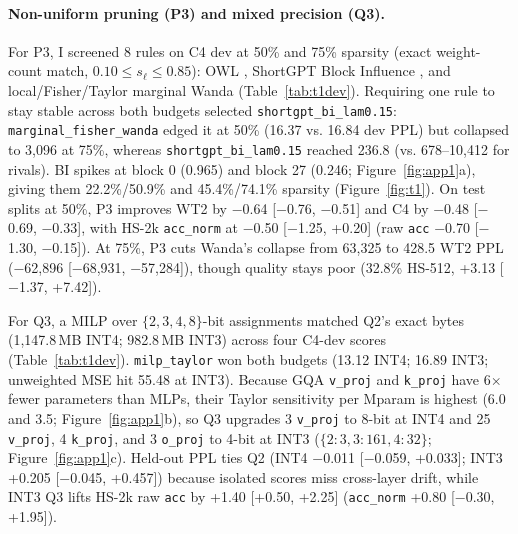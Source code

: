\documentclass{article}
\begin{document}
\paragraph{Non-uniform pruning (P3) and mixed precision (Q3).}
For P3, I screened 8 rules on C4 dev at 50\% and 75\% sparsity (exact weight-count match, $0.10 \le s_\ell \le 0.85$): OWL \citep{yin2024owl}, ShortGPT Block Influence \citep{men2024shortgpt}, and local/Fisher/Taylor marginal Wanda (Table~\ref{tab:t1dev}). Requiring one rule to stay stable across both budgets selected \texttt{shortgpt\_bi\_lam0.15}: \texttt{marginal\_fisher\_wanda} edged it at 50\% (16.37 vs. 16.84 dev PPL) but collapsed to 3,096 at 75\%, whereas \texttt{shortgpt\_bi\_lam0.15} reached 236.8 (vs. 678--10,412 for rivals). BI spikes at block 0 (0.965) and block 27 (0.246; Figure~\ref{fig:app1}a), giving them 22.2\%/50.9\% and 45.4\%/74.1\% sparsity (Figure~\ref{fig:t1}). On test splits at 50\%, P3 improves WT2 by $-$0.64 [$-$0.76, $-$0.51] and C4 by $-$0.48 [$-$0.69, $-$0.33], with HS-2k \texttt{acc\_norm} at $-$0.50 [$-$1.25, +0.20] (raw \texttt{acc} $-$0.70 [$-$1.30, $-$0.15]). At 75\%, P3 cuts Wanda's collapse from 63,325 to 428.5 WT2 PPL ($-$62,896 [$-$68,931, $-$57,284]), though quality stays poor (32.8\% HS-512, +3.13 [$-$1.37, +7.42]).

For Q3, a MILP over $\{2,3,4,8\}$-bit assignments matched Q2's exact bytes (1,147.8\,MB INT4; 982.8\,MB INT3) across four C4-dev scores (Table~\ref{tab:t1dev}). \texttt{milp\_taylor} won both budgets (13.12 INT4; 16.89 INT3; unweighted MSE hit 55.48 at INT3). Because GQA \texttt{v\_proj} and \texttt{k\_proj} have 6$\times$ fewer parameters than MLPs, their Taylor sensitivity per Mparam is highest (6.0 and 3.5; Figure~\ref{fig:app1}b), so Q3 upgrades 3 \texttt{v\_proj} to 8-bit at INT4 and 25 \texttt{v\_proj}, 4 \texttt{k\_proj}, and 3 \texttt{o\_proj} to 4-bit at INT3 ($\{2{:}3, 3{:}161, 4{:}32\}$; Figure~\ref{fig:app1}c). Held-out PPL ties Q2 (INT4 $-$0.011 [$-$0.059, +0.033]; INT3 +0.205 [$-$0.045, +0.457]) because isolated scores miss cross-layer drift, while INT3 Q3 lifts HS-2k raw \texttt{acc} by +1.40 [+0.50, +2.25] (\texttt{acc\_norm} +0.80 [$-$0.30, +1.95]).
\end{document}
